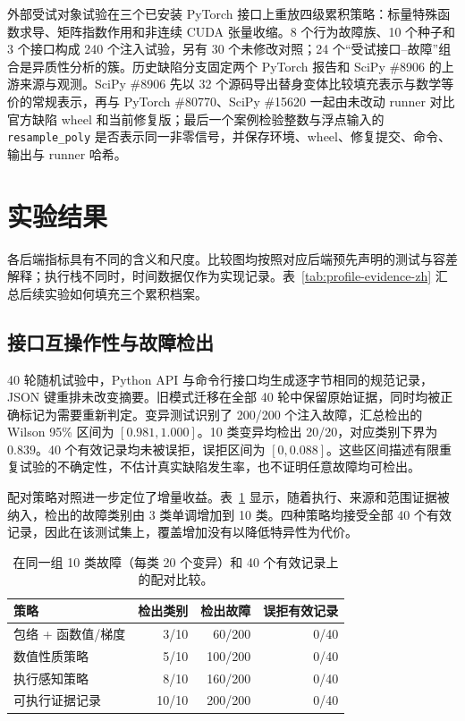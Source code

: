 \documentclass[preprint,12pt,authoryear]{elsarticle}
\begin{document}
外部受试对象试验在三个已安装 PyTorch 接口上重放四级累积策略：标量特殊函数求导、矩阵指数作用和非连续 CUDA 张量收缩。8 个行为故障族、10 个种子和 3 个接口构成 240 个注入试验，另有 30 个未修改对照；24 个“受试接口--故障”组合是异质性分析的簇。历史缺陷分支固定两个 PyTorch 报告和 SciPy \#8906 的上游来源与观测。SciPy \#8906 先以 32 个源码导出替身变体比较填充表示与数学等价的常规表示，再与 PyTorch \#80770、SciPy \#15620 一起由未改动 runner 对比官方缺陷 wheel 和当前修复版；最后一个案例检验整数与浮点输入的 \texttt{resample\_poly} 是否表示同一非零信号，并保存环境、wheel、修复提交、命令、输出与 runner 哈希。

\section{实验结果}
各后端指标具有不同的含义和尺度。比较图均按照对应后端预先声明的测试与容差解释；执行栈不同时，时间数据仅作为实现记录。表~\ref{tab:profile-evidence-zh} 汇总后续实验如何填充三个累积档案。
\subsection{接口互操作性与故障检出}
40 轮随机试验中，Python API 与命令行接口均生成逐字节相同的规范记录，JSON 键重排未改变摘要。旧模式迁移在全部 40 轮中保留原始证据，同时均被正确标记为需要重新判定。变异测试识别了 200/200 个注入故障，汇总检出的 Wilson 95\% 区间为 $[0.981,1.000]$。10 类变异均检出 20/20，对应类别下界为 $0.839$。40 个有效记录均未被误拒，误拒区间为 $[0,0.088]$。这些区间描述有限重复试验的不确定性，不估计真实缺陷发生率，也不证明任意故障均可检出。

配对策略对照进一步定位了增量收益。表~\ref{tab:strategy-comparison-zh} 显示，随着执行、来源和范围证据被纳入，检出的故障类别由 3 类单调增加到 10 类。四种策略均接受全部 40 个有效记录，因此在该测试集上，覆盖增加没有以降低特异性为代价。

\begin{table}[!htbp]
\centering
\caption{在同一组 10 类故障（每类 20 个变异）和 40 个有效记录上的配对比较。}
\label{tab:strategy-comparison-zh}
\begin{tabular}{lrrr}
\toprule
策略 & 检出类别 & 检出故障 & 误拒有效记录 \\
\midrule
包络 + 函数值/梯度 & 3/10 & 60/200 & 0/40 \\
数值性质策略 & 5/10 & 100/200 & 0/40 \\
执行感知策略 & 8/10 & 160/200 & 0/40 \\
可执行证据记录 & 10/10 & 200/200 & 0/40 \\
\bottomrule
\end{tabular}
\end{table}
\end{document}

